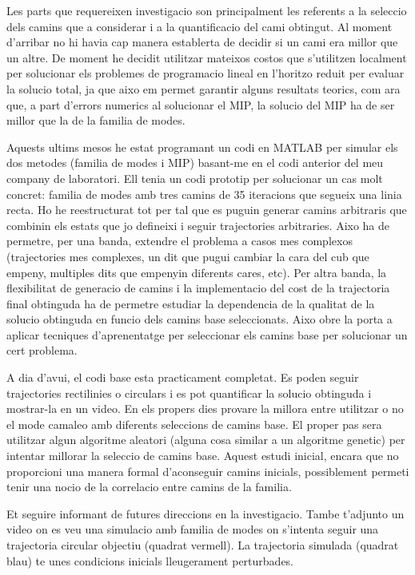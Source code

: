 \documentclass[12,twoside]{TFG-GM}
\theoremstyle{definition}
\theoremstyle{remark}
\begin{document}
Les parts que requereixen investigacio son principalment les referents a la seleccio dels camins que a considerar i a la quantificacio del cami obtingut. Al moment d'arribar no hi havia cap manera establerta de decidir si un cami era millor que un altre. De moment he decidit utilitzar mateixos costos que s'utilitzen localment per solucionar els problemes de programacio lineal en l'horitzo reduit per evaluar la solucio total, ja que aixo em permet garantir alguns resultats teorics, com ara que, a part d'errors numerics al solucionar el MIP, la solucio del MIP ha de ser millor que la de la familia de modes.

Aquests ultims mesos he estat programant un codi en MATLAB per simular els dos metodes (familia de modes i MIP) basant-me en el codi anterior del meu company de laboratori. Ell tenia un codi prototip per solucionar un cas molt concret: familia de modes amb tres camins de 35 iteracions que segueix una linia recta. Ho he reestructurat tot per tal que es puguin generar camins arbitraris que combinin els estats que jo defineixi i seguir trajectories arbitraries. Aixo ha de permetre, per una banda, extendre el problema a casos mes complexos (trajectories mes complexes, un dit que pugui cambiar la cara del cub que empeny, multiples dits que empenyin diferents cares, etc). Per altra banda, la flexibilitat de generacio de camins i la implementacio del cost de la trajectoria final obtinguda ha de permetre estudiar la dependencia de la qualitat de la solucio obtinguda en funcio dels camins base seleccionats. Aixo obre la porta a aplicar tecniques d'aprenentatge per seleccionar els camins base per solucionar un cert problema.

A dia d'avui, el codi base esta practicament completat. Es poden seguir trajectories rectilinies o circulars i es pot quantificar la solucio obtinguda i mostrar-la en un video. En els propers dies provare la millora entre utilitzar o no el mode camaleo amb diferents seleccions de camins base. El proper pas sera utilitzar algun algoritme aleatori (alguna cosa similar a un algoritme genetic) per intentar millorar la seleccio de camins base. Aquest estudi inicial, encara que no proporcioni una manera formal d'aconseguir camins inicials, possiblement permeti tenir una nocio de la correlacio entre camins de la familia.

Et seguire informant de futures direccions en la investigacio. Tambe t'adjunto un video on es veu una simulacio amb familia de modes on s'intenta seguir una trajectoria circular objectiu (quadrat vermell). La trajectoria simulada (quadrat blau) te unes condicions inicials lleugerament perturbades.
\end{document}
